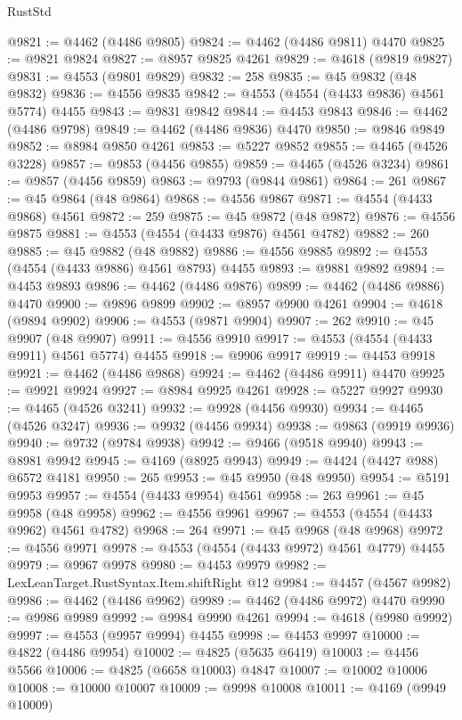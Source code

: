 \begin{lexlean}{RustStd}
\begin{coremodule}
@9821 := @4462 (@4486 @9805)
@9824 := @4462 (@4486 @9811) @4470
@9825 := @9821 @9824
@9827 := @8957 @9825 @4261
@9829 := @4618 (@9819 @9827)
@9831 := @4553 (@9801 @9829)
@9832 := 258
@9835 := @45 @9832 (@48 @9832)
@9836 := @4556 @9835
@9842 := @4553 (@4554 (@4433 @9836) @4561 @5774) @4455
@9843 := @9831 @9842
@9844 := @4453 @9843
@9846 := @4462 (@4486 @9798)
@9849 := @4462 (@4486 @9836) @4470
@9850 := @9846 @9849
@9852 := @8984 @9850 @4261
@9853 := @5227 @9852
@9855 := @4465 (@4526 @3228)
@9857 := @9853 (@4456 @9855)
@9859 := @4465 (@4526 @3234)
@9861 := @9857 (@4456 @9859)
@9863 := @9793 (@9844 @9861)
@9864 := 261
@9867 := @45 @9864 (@48 @9864)
@9868 := @4556 @9867
@9871 := @4554 (@4433 @9868) @4561
@9872 := 259
@9875 := @45 @9872 (@48 @9872)
@9876 := @4556 @9875
@9881 := @4553 (@4554 (@4433 @9876) @4561 @4782)
@9882 := 260
@9885 := @45 @9882 (@48 @9882)
@9886 := @4556 @9885
@9892 := @4553 (@4554 (@4433 @9886) @4561 @8793) @4455
@9893 := @9881 @9892
@9894 := @4453 @9893
@9896 := @4462 (@4486 @9876)
@9899 := @4462 (@4486 @9886) @4470
@9900 := @9896 @9899
@9902 := @8957 @9900 @4261
@9904 := @4618 (@9894 @9902)
@9906 := @4553 (@9871 @9904)
@9907 := 262
@9910 := @45 @9907 (@48 @9907)
@9911 := @4556 @9910
@9917 := @4553 (@4554 (@4433 @9911) @4561 @5774) @4455
@9918 := @9906 @9917
@9919 := @4453 @9918
@9921 := @4462 (@4486 @9868)
@9924 := @4462 (@4486 @9911) @4470
@9925 := @9921 @9924
@9927 := @8984 @9925 @4261
@9928 := @5227 @9927
@9930 := @4465 (@4526 @3241)
@9932 := @9928 (@4456 @9930)
@9934 := @4465 (@4526 @3247)
@9936 := @9932 (@4456 @9934)
@9938 := @9863 (@9919 @9936)
@9940 := @9732 (@9784 @9938)
@9942 := @9466 (@9518 @9940)
@9943 := @8981 @9942
@9945 := @4169 (@8925 @9943)
@9949 := @4424 (@4427 @988) @6572 @4181
@9950 := 265
@9953 := @45 @9950 (@48 @9950)
@9954 := @5191 @9953
@9957 := @4554 (@4433 @9954) @4561
@9958 := 263
@9961 := @45 @9958 (@48 @9958)
@9962 := @4556 @9961
@9967 := @4553 (@4554 (@4433 @9962) @4561 @4782)
@9968 := 264
@9971 := @45 @9968 (@48 @9968)
@9972 := @4556 @9971
@9978 := @4553 (@4554 (@4433 @9972) @4561 @4779) @4455
@9979 := @9967 @9978
@9980 := @4453 @9979
@9982 := LexLeanTarget.RustSyntax.Item.shiftRight @12
@9984 := @4457 (@4567 @9982)
@9986 := @4462 (@4486 @9962)
@9989 := @4462 (@4486 @9972) @4470
@9990 := @9986 @9989
@9992 := @9984 @9990 @4261
@9994 := @4618 (@9980 @9992)
@9997 := @4553 (@9957 @9994) @4455
@9998 := @4453 @9997
@10000 := @4822 (@4486 @9954)
@10002 := @4825 (@5635 @6419)
@10003 := @4456 @5566
@10006 := @4825 (@6658 @10003) @4847
@10007 := @10002 @10006
@10008 := @10000 @10007
@10009 := @9998 @10008
@10011 := @4169 (@9949 @10009)

\end{coremodule}
\end{lexlean}
